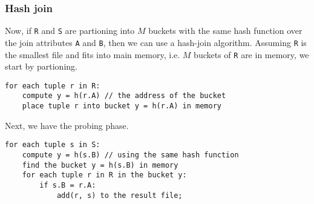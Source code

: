 \documentclass[a4paper, openany]{memoir}
\theoremstyle{definition}
\theoremstyle{plain}
\begin{document}
\subsubsection{Hash join}
Now, if \texttt{R} and \texttt{S} are partioning into $M$ buckets with the same hash function over the join attributes \texttt{A} and \texttt{B}, then we can use a hash-join algorithm. Assuming \texttt{R} is the smallest file and fits into main memory, i.e. $M$ buckets of \texttt{R} are in memory, we start by partioning.
\begin{verbatim}
for each tuple r in R:
    compute y = h(r.A) // the address of the bucket
    place tuple r into bucket y = h(r.A) in memory
\end{verbatim}
Next, we have the probing phase.
\begin{verbatim}
for each tuple s in S:
    compute y = h(s.B) // using the same hash function
    find the bucket y = h(s.B) in memory
    for each tuple r in R in the bucket y:
        if s.B = r.A:
            add(r, s) to the result file;
\end{verbatim}





\end{document}
